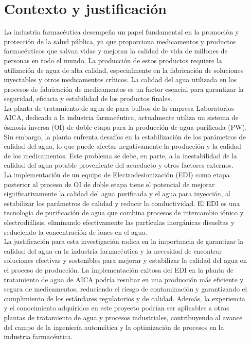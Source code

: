 \section*{Contexto y justificación}
La industria farmacéutica desempeña un papel fundamental en la promoción y protección de la salud pública, ya que proporciona medicamentos y productos farmacéuticos que salvan vidas y mejoran la calidad de vida de millones de personas en todo el mundo. La producción de estos productos requiere la utilización de agua de alta calidad, especialmente en la fabricación de soluciones inyectables y otros medicamentos críticos. La calidad del agua utilizada en los procesos de fabricación de medicamentos es un factor esencial para garantizar la seguridad, eficacia y estabilidad de los productos finales.\\

La planta de tratamiento de agua de para bulbos de la empresa Laboratorios AICA, dedicada a la industria farmacéutica, actualmente utiliza un sistema de ósmosis inversa (OI) de doble etapa para la producción de agua purificada (PW). Sin embargo, la planta enfrenta desafíos en la estabilización de los parámetros de calidad del agua, lo que puede afectar negativamente la producción y la calidad de los medicamentos. Este problema se debe, en parte, a la inestabilidad de la calidad del agua potable proveniente del acueducto y otros factores externos.\\

La implementación de un equipo de Electrodesionización (EDI) como etapa posterior al proceso de OI de doble etapa tiene el potencial de mejorar significativamente la calidad del agua purificada y el agua para inyección, al estabilizar los parámetros de calidad y reducir la conductividad. El EDI es una tecnología de purificación de agua que combina procesos de intercambio iónico y electrodiálisis, eliminando efectivamente las partículas inorgánicas disueltas y reduciendo la concentración de iones en el agua.\\

La justificación para esta investigación radica en la importancia de garantizar la calidad del agua en la industria farmacéutica y la necesidad de encontrar soluciones efectivas y sostenibles para mejorar y estabilizar la calidad del agua en el proceso de producción. La implementación exitosa del EDI en la planta de tratamiento de agua de AICA podría resultar en una producción más eficiente y segura de medicamentos, reduciendo el riesgo de contaminación y garantizando el cumplimiento de los estándares regulatorios y de calidad. Además, la experiencia y el conocimiento adquiridos en este proyecto podrían ser aplicables a otras plantas de tratamiento de agua y procesos industriales, contribuyendo al avance del campo de la ingeniería automática y la optimización de procesos en la industria farmacéutica.\\
